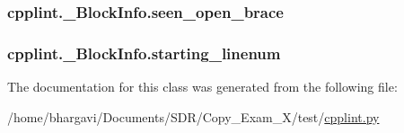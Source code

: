 \subsubsection[{\texorpdfstring{seen\+\_\+open\+\_\+brace}{seen_open_brace}}]{\setlength{\rightskip}{0pt plus 5cm}cpplint.\+\_\+\+Block\+Info.\+seen\+\_\+open\+\_\+brace}\hypertarget{classcpplint_1_1___block_info_aa974539217437751383ad20896c974d7}{}\label{classcpplint_1_1___block_info_aa974539217437751383ad20896c974d7}
\subsubsection[{\texorpdfstring{starting\+\_\+linenum}{starting_linenum}}]{\setlength{\rightskip}{0pt plus 5cm}cpplint.\+\_\+\+Block\+Info.\+starting\+\_\+linenum}\hypertarget{classcpplint_1_1___block_info_a81d316f03e42aebbfe0636f905c4c291}{}\label{classcpplint_1_1___block_info_a81d316f03e42aebbfe0636f905c4c291}


The documentation for this class was generated from the following file\+:\begin{DoxyCompactItemize}
\item 
/home/bhargavi/\+Documents/\+S\+D\+R/\+Copy\+\_\+\+Exam\+\_\+X/test/\hyperlink{cpplint_8py}{cpplint.\+py}\end{DoxyCompactItemize}
